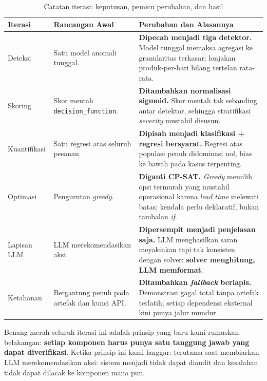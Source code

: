 \documentclass[12pt,a4paper]{article}
\begin{document}
\begin{table}[H]
  \centering\footnotesize
  \caption{Catatan iterasi: keputusan, pemicu perubahan, dan hasil}
  \begin{tabularx}{\textwidth}{L{2.1cm} L{3.0cm} Y}
    \toprule
    \textbf{Iterasi} & \textbf{Rancangan Awal} & \textbf{Perubahan dan Alasannya} \\
    \midrule
    Deteksi
      & Satu model anomali tunggal.
      & \textbf{Dipecah menjadi tiga detektor.} Model tunggal memaksa agregasi ke granularitas terkasar; lonjakan produk-per-hari hilang tertelan rata-rata. \\[1.5pt]
    Skoring
      & Skor mentah \texttt{decision\_function}.
      & \textbf{Ditambahkan normalisasi sigmoid.} Skor mentah tak sebanding antar detektor, sehingga stratifikasi \textit{severity} mustahil disusun. \\[1.5pt]
    Kuantifikasi
      & Satu regresi atas seluruh pesanan.
      & \textbf{Dipisah menjadi klasifikasi + regresi bersyarat.} Regresi atas populasi penuh didominasi nol, bias ke bawah pada kasus terpenting. \\[1.5pt]
    Optimasi
      & Pengurutan \textit{greedy}.
      & \textbf{Diganti CP-SAT.} \textit{Greedy} memilih opsi termurah yang mustahil operasional karena \textit{lead time} melewati batas; kendala perlu deklaratif, bukan tambalan \textit{if}. \\[1.5pt]
    Lapisan LLM
      & LLM merekomendasikan aksi.
      & \textbf{Dipersempit menjadi penjelasan saja.} LLM menghasilkan saran meyakinkan tapi tak konsisten dengan solver: \textbf{solver menghitung, LLM memformat}. \\[1.5pt]
    Ketahanan
      & Bergantung penuh pada artefak dan kunci API.
      & \textbf{Ditambahkan \textit{fallback} berlapis.} Demonstrasi gagal total tanpa artefak terlatih; setiap dependensi eksternal kini punya jalur mundur. \\
    \bottomrule
  \end{tabularx}
\end{table}

Benang merah seluruh iterasi ini adalah prinsip yang baru kami rumuskan belakangan: \textbf{setiap komponen harus punya satu tanggung jawab yang dapat diverifikasi}. Ketika prinsip ini kami langgar: terutama saat membiarkan LLM merekomendasikan aksi: sistem menjadi tidak dapat diaudit dan kesalahan tidak dapat dilacak ke komponen mana pun.

\end{document}
